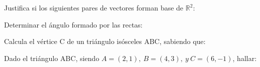\documentclass[addpoints,spanish, 12pt,a4paper]{exam}
\begin{document}
        \begin{questions}
        \question[1] Justifica si los siguientes pares de vectores forman base de $\mathbb{R}^2$:
        \begin{multicols}{2} 
        \end{multicols}
        \question Determinar el ángulo formado por las rectas:
        \begin{multicols}{1} 
        \end{multicols}
        \question Calcula el vértice C de un triángulo isósceles ABC, sabiendo que:
        \begin{multicols}{1} 
        \end{multicols}
        \question[3] Dado el triángulo ABC, siendo $ A=(2, 1), \ B=(4, 3),\  y \ C=(6, -1) $, hallar: 


\end{questions}
\end{document}
